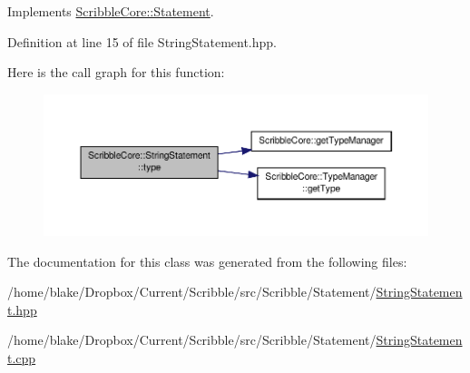 Implements \hyperlink{class_scribble_core_1_1_statement_a532ed5a44ec49873dc191dae7ddc8b00}{Scribble\-Core\-::\-Statement}.



Definition at line 15 of file String\-Statement.\-hpp.



Here is the call graph for this function\-:
\nopagebreak
\begin{figure}[H]
\begin{center}
\leavevmode
\includegraphics[width=350pt]{class_scribble_core_1_1_string_statement_ac7c9a403ea405c1d248079bdb59a4b4b_cgraph}
\end{center}
\end{figure}




The documentation for this class was generated from the following files\-:\begin{DoxyCompactItemize}
\item 
/home/blake/\-Dropbox/\-Current/\-Scribble/src/\-Scribble/\-Statement/\hyperlink{_string_statement_8hpp}{String\-Statement.\-hpp}\item 
/home/blake/\-Dropbox/\-Current/\-Scribble/src/\-Scribble/\-Statement/\hyperlink{_string_statement_8cpp}{String\-Statement.\-cpp}\end{DoxyCompactItemize}
